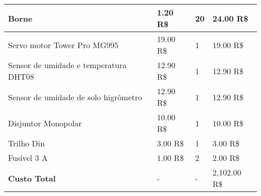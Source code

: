 \begin{table}[!htbp]
\begin{center}
{\begin{tabular}{|p{4cm}|p{4cm}|p{3cm}|p{4cm}|}
Borne & 1.20 R\$ & 20 & 24.00 R\$\\\hline
Servo motor Tower Pro MG995 & 19.00 R\$ & 1 & 19.00 R\$\\\hline
Sensor de umidade e temperatura DHT08 & 12.90 R\$ & 1 & 12.90 R\$\\\hline
Sensor de umidade de solo higrômetro & 12.90 R\$ & 1 & 12.90 R\$\\\hline
Disjuntor Monopolar & 10.00 R\$ & 1 & 10.00 R\$\\\hline
Trilho Din & 3.00 R\$ & 1 & 3.00 R\$\\\hline
Fusível 3 A & 1.00 R\$ & 2 & 2.00 R\$\\\hline\hline
\textbf{Custo Total} & - & - & 2,102.00 R\$\\\hline
\end{tabular}
}
\end{center}
\end{table}
